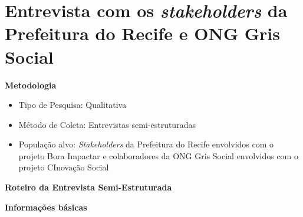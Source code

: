 \chapter{Entrevista com os \textit{stakeholders} da Prefeitura do Recife e ONG Gris Social} 
\par\vspace{1\baselineskip}
\textbf{Metodologia}
\begin{itemize}
    \item Tipo de Pesquisa: Qualitativa
    \item Método de Coleta: Entrevistas semi-estruturadas
    \item População alvo: \textit{Stakeholders} da Prefeitura do Recife envolvidos com o projeto Bora Impactar e colaboradores da \gls{ONG} Gris Social envolvidos com o projeto CInovação Social
\end{itemize}
\par\vspace{1\baselineskip}
\textbf{Roteiro da Entrevista Semi-Estruturada}
\par\vspace{1\baselineskip}
\textbf{Informações básicas}
